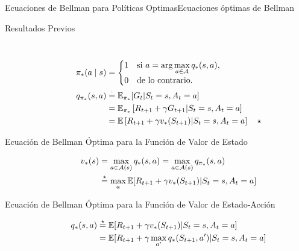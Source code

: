 \documentclass[10pt, envcountsect, handout, aspectratio=1610, hyperref={hypertexnames=true}]{beamer}
\begin{document}
\begin{frame}{Ecuaciones de Bellman para Políticas Optimas}{Ecuaciones óptimas de Bellman}
  
\begin{description}
\item[\color{reddark}  Resultados Previos]

~\vskip-7mm ~
    \begin{align*} 
    \pi_*(a \mid s) & = 
\begin{cases} 
1 & \text{si } a = \arg\max\limits_{a \in \mathcal{A}} q_*(s, a), \\
0 & \text{de lo contrario}.
\end{cases} \\
    q_{\pi_*}(s,a) & \stackrel{\cdot}{=} \mathbb{E}_{\pi_*}[G_t|S_t=s, A_t=a] \\
    			   & = \mathbb{E}_{\pi_*} \left[R_{t+1} + \gamma G_{t+1} |S_t=s, A_t=a\right] \\
				   & = \mathbb{E} \left[R_{t+1} + \gamma v_*(S_{t+1}) |S_t=s, A_t=a\right]  \quad \star
	\end{align*}  



\item [\color{reddark} Ecuación de Bellman Óptima para la Función de Valor de Estado]
    
    \begin{align*}
    v_*(s) & = \max_{a\in {\cal A}(s)} q_*(s,a) = \max_{a\in {\cal A}(s)} q_{\pi_*}(s,a) \\
		    & \stackrel{\star}{=} \max_a \mathbb{E}[R_{t+1} + \gamma v_*(S_{t+1}) |S_t=s, A_t=a]
	\end{align*}

\item[\color{reddark} Ecuación de Bellman Óptima para la Función de Valor de Estado-Acción]
    
    \begin{align*}
    q_*(s,a) & \stackrel{\star}{=} \mathbb{E}[R_{t+1} + \gamma v_*(S_{t+1}) |S_t=s, A_t=a] \\
    		& = \mathbb{E}[R_{t+1}+ \gamma \max_{a'} q_* (S_{t+1}, a') |S_t=s, A_t=a]
	\end{align*}
	
\end{description}

\end{frame}
\end{document}
